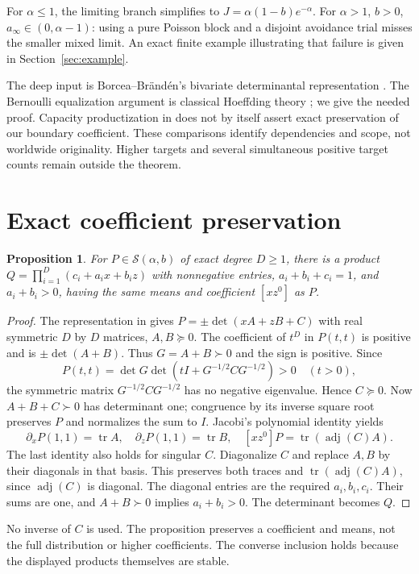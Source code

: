 \documentclass[11pt]{article}
\newtheorem{proposition}[theorem]{Proposition}
\newcommand{\tr}{\operatorname{tr}}
\newcommand{\adj}{\operatorname{adj}}
\begin{document}
For $\alpha\le1$, the limiting branch simplifies to
$J=\alpha(1-b)e^{-\alpha}$. For $\alpha>1$, $b>0$,
$a_\infty\in(0,\alpha-1)$: using a pure Poisson block and a disjoint
avoidance trial misses the smaller mixed limit. An exact finite example
illustrating that failure is given in Section~\ref{sec:example}.

The deep input is Borcea--Br\"and\'en's bivariate determinantal
representation \cite[Corollary 6.7]{BB}. The Bernoulli equalization
argument is classical Hoeffding theory \cite{Hoeffding}; we give the
needed proof. Capacity productization in \cite{GL,GKL} does not by
itself assert exact preservation of our boundary coefficient.
These comparisons identify dependencies and scope, not worldwide
originality. Higher targets and several simultaneous positive target
counts remain outside the theorem.

\section{Exact coefficient preservation}
\begin{proposition}\label{prop:pinch}
For $P\in\mathcal S(\alpha,b)$ of exact degree $D\ge1$, there is a product
$Q=\prod_{i=1}^D(c_i+a_ix+b_iz)$ with nonnegative entries,
$a_i+b_i+c_i=1$, and $a_i+b_i>0$, having the same means and coefficient
$[xz^0]$ as $P$.
\end{proposition}
\begin{proof}
The representation in \cite{BB} gives
$P=\pm\det(xA+zB+C)$ with real symmetric $D$ by $D$ matrices,
$A,B\succeq0$. The coefficient of $t^D$ in $P(t,t)$ is positive and
is $\pm\det(A+B)$. Thus $G=A+B\succ0$ and the sign is positive.
Since
\[
 P(t,t)=\det G\det(tI+G^{-1/2}CG^{-1/2})>0\quad(t>0),
\]
the symmetric matrix $G^{-1/2}CG^{-1/2}$ has no negative eigenvalue.
Hence $C\succeq0$. Now $A+B+C\succ0$ has determinant one; congruence
by its inverse square root preserves $P$ and normalizes the sum to $I$.
Jacobi's polynomial identity yields
\[
 \partial_xP(1,1)=\tr A,\quad \partial_zP(1,1)=\tr B,
 \quad [xz^0]P=\tr(\adj(C)A).
\]
The last identity also holds for singular $C$. Diagonalize $C$ and
replace $A,B$ by their diagonals in that basis. This preserves both
traces and $\tr(\adj(C)A)$, since $\adj(C)$ is diagonal. The diagonal
entries are the required $a_i,b_i,c_i$. Their sums are one, and
$A+B\succ0$ implies $a_i+b_i>0$. The determinant becomes $Q$.
\end{proof}
No inverse of $C$ is used. The proposition preserves a coefficient and
means, not the full distribution or higher coefficients. The converse
inclusion holds because the displayed products themselves are stable.
\end{document}

